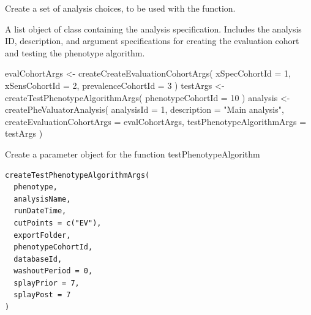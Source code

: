 \documentclass[a4paper]{book}
\begin{document}
%
\begin{Details}
Create a set of analysis choices, to be used with the  function.
\end{Details}
%
\begin{Value}
A list object of class  containing the analysis specification.
Includes the analysis ID, description, and argument specifications for creating the evaluation cohort
and testing the phenotype algorithm.
\end{Value}
%
\begin{Examples}
\begin{ExampleCode}
evalCohortArgs <- createCreateEvaluationCohortArgs(
  xSpecCohortId = 1,
  xSensCohortId = 2,
  prevalenceCohortId = 3
)
testArgs <- createTestPhenotypeAlgorithmArgs(
  phenotypeCohortId = 10
)
analysis <- createPheValuatorAnalysis(
  analysisId = 1,
  description = "Main analysis",
  createEvaluationCohortArgs = evalCohortArgs,
  testPhenotypeAlgorithmArgs = testArgs
)

\end{ExampleCode}
\end{Examples}
%
\begin{Description}
Create a parameter object for the function testPhenotypeAlgorithm
\end{Description}
%
\begin{Usage}
\begin{verbatim}
createTestPhenotypeAlgorithmArgs(
  phenotype,
  analysisName,
  runDateTime,
  cutPoints = c("EV"),
  exportFolder,
  phenotypeCohortId,
  databaseId,
  washoutPeriod = 0,
  splayPrior = 7,
  splayPost = 7
)
\end{verbatim}
\end{Usage}
%
\end{document}
